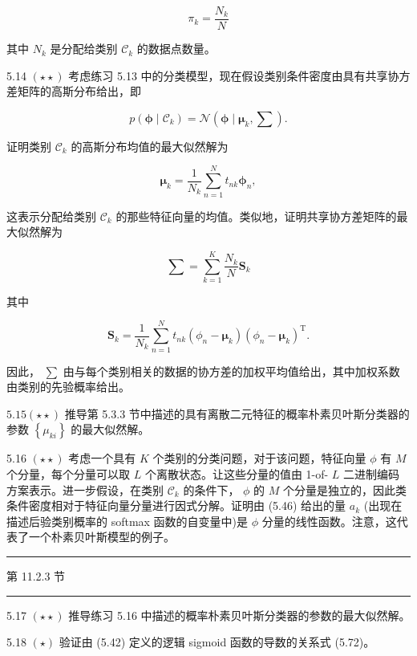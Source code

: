 \documentclass[10pt]{report}
\newcommand{\HRule}{\begin{center}\rule{0.9\linewidth}{0.2mm}\end{center}}
\begin{document}
\[
{\pi }_{k} = \frac{{N}_{k}}{N} \tag{5.101}
\]

其中 \({N}_{k}\) 是分配给类别 \({\mathcal{C}}_{k}\) 的数据点数量。

5.14 \(\left( {\star  \star  }\right)\) 考虑练习 5.13 中的分类模型，现在假设类别条件密度由具有共享协方差矩阵的高斯分布给出，即

\[
p\left( {\mathbf{\phi } \mid  {\mathcal{C}}_{k}}\right)  = \mathcal{N}\left( {\mathbf{\phi } \mid  {\mathbf{\mu }}_{k},\mathbf{\sum }}\right) . \tag{5.102}
\]

证明类别 \({\mathcal{C}}_{k}\) 的高斯分布均值的最大似然解为

\[
{\mathbf{\mu }}_{k} = \frac{1}{{N}_{k}}\mathop{\sum }\limits_{{n = 1}}^{N}{t}_{nk}{\mathbf{\phi }}_{n}, \tag{5.103}
\]

这表示分配给类别 \({\mathcal{C}}_{k}\) 的那些特征向量的均值。类似地，证明共享协方差矩阵的最大似然解为

\[
\mathbf{\sum } = \mathop{\sum }\limits_{{k = 1}}^{K}\frac{{N}_{k}}{N}{\mathbf{S}}_{k} \tag{5.104}
\]

其中

\[
{\mathbf{S}}_{k} = \frac{1}{{N}_{k}}\mathop{\sum }\limits_{{n = 1}}^{N}{t}_{nk}\left( {{\phi }_{n} - {\mathbf{\mu }}_{k}}\right) {\left( {\phi }_{n} - {\mathbf{\mu }}_{k}\right) }^{\mathrm{T}}. \tag{5.105}
\]

因此， \(\mathbf{\sum }\) 由与每个类别相关的数据的协方差的加权平均值给出，其中加权系数由类别的先验概率给出。

\({5.15}\left( {\star  \star  }\right)\) 推导第 5.3.3 节中描述的具有离散二元特征的概率朴素贝叶斯分类器的参数 \(\left\{  {\mu }_{ki}\right\}\) 的最大似然解。

5.16 \(\left( {\star  \star  }\right)\) 考虑一个具有 \(K\) 个类别的分类问题，对于该问题，特征向量 \(\phi\) 有 \(M\) 个分量，每个分量可以取 \(L\) 个离散状态。让这些分量的值由 1-of- \(L\) 二进制编码方案表示。进一步假设，在类别 \({\mathcal{C}}_{k}\) 的条件下， \(\phi\) 的 \(M\) 个分量是独立的，因此类条件密度相对于特征向量分量进行因式分解。证明由 (5.46) 给出的量 \({a}_{k}\) (出现在描述后验类别概率的 softmax 函数的自变量中)是 \(\phi\) 分量的线性函数。注意，这代表了一个朴素贝叶斯模型的例子。

\HRule

第 11.2.3 节

\HRule

5.17 \(\left( {\star  \star  }\right)\) 推导练习 5.16 中描述的概率朴素贝叶斯分类器的参数的最大似然解。

5.18 \(\left( \star \right)\) 验证由 (5.42) 定义的逻辑 sigmoid 函数的导数的关系式 (5.72)。
\end{document}
